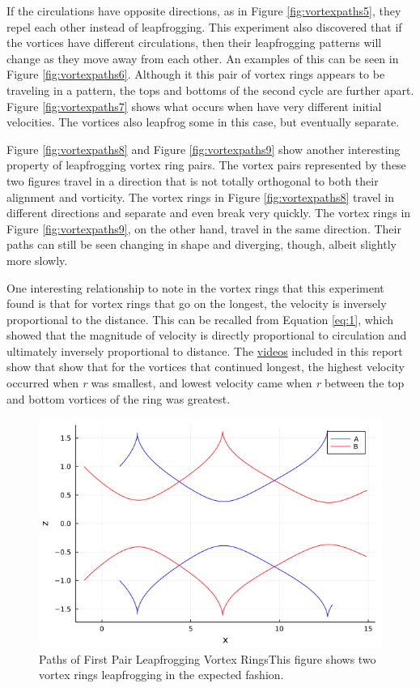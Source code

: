 \documentclass{article}
\begin{document}
If the circulations have opposite directions, as in Figure \ref{fig:vortexpaths5}, they repel each other instead of leapfrogging. This experiment also discovered that if the vortices have different circulations, then their leapfrogging patterns will change as they move away from each other. An examples of this can be seen in Figure \ref{fig:vortexpaths6}. Although it this pair of vortex rings appears to be traveling in a pattern, the tops and bottoms of the second cycle are further apart. Figure \ref{fig:vortexpaths7} shows what occurs when have very different initial velocities. The vortices also leapfrog some in this case, but eventually separate.\newline

Figure \ref{fig:vortexpaths8} and Figure \ref{fig:vortexpaths9} show another interesting property of leapfrogging vortex ring pairs. The vortex pairs represented by these two figures travel in a direction that is not totally orthogonal to both their alignment and vorticity. The vortex rings in Figure \ref{fig:vortexpaths8} travel in different directions and separate and even break very quickly. The vortex rings in Figure \ref{fig:vortexpaths9}, on the other hand, travel in the same direction. Their paths can still be seen changing in shape and diverging, though, albeit slightly more slowly.

One interesting relationship to note in the vortex rings that this experiment found is that for vortex rings that go on the longest, the velocity is inversely proportional to the distance. This can be recalled from Equation \ref{eq:1}, which showed that the magnitude of velocity is directly proportional to circulation and ultimately inversely proportional to distance. The 
\href{https://imgur.com/U4cND6X,}{videos} included in this report show that show that for the vortices that continued longest, the highest velocity occurred when \emph{r} was smallest, and lowest velocity came when \emph{r} between the top and bottom vortices of the ring was greatest.

\begin{figure}[htb]
	\centering
	\includegraphics[width=\textwidth]{Graph_A.png}
	\caption{Paths of First Pair Leapfrogging Vortex Rings\newline This figure shows two vortex rings leapfrogging in the expected fashion.}
	\label{fig:vortexpaths1}
\end{figure} 
\end{document}

